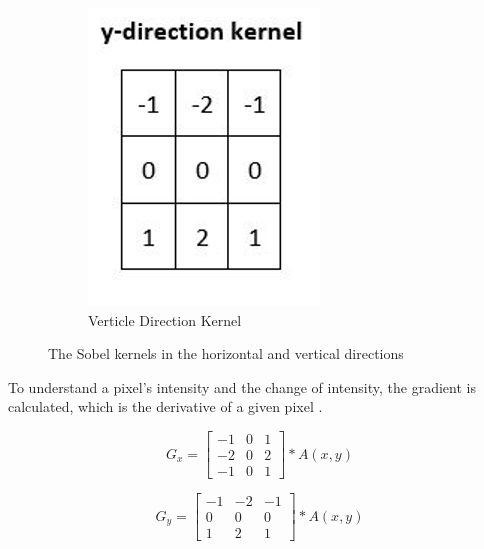 \documentclass[conference]{IEEEtran}
\begin{document}
\begin{figure}[ht]
\begin{subfigure}[b]{0.45\linewidth}
    \includegraphics[width=\linewidth]{images/Picture9.png}
    \caption{Verticle Direction Kernel}
  \end{subfigure}
  \caption{The Sobel kernels in the horizontal and vertical directions \cite{b12}}
  \label{fig:combined3}
  
\end{figure}

To understand a pixel's intensity and the change of intensity, the gradient is calculated, which is the derivative of a given pixel \cite{b12}.  

\begin{equation}
    G_x = \begin{bmatrix}
    -1 & 0 & 1 \\
    -2 & 0 & 2 \\
    -1 & 0 & 1
    \end{bmatrix} * A(x, y)
    \label{eq:GX}
\end{equation}

\begin{equation}
    G_y = \begin{bmatrix}
    -1 & -2 & -1 \\
    0 & 0 & 0 \\
    1 & 2 & 1
    \end{bmatrix} * A(x, y)
    \label{eq:GY}
\end{equation}
\end{document}
